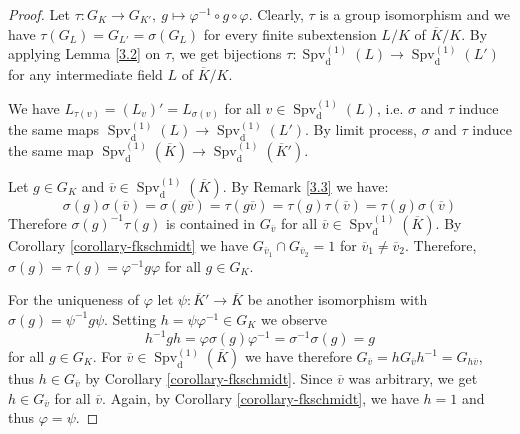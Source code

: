 \begin{proof}
Let $\tau:G_K\to G_{K'},\ g\mapsto \varphi^{-1}\circ g\circ \varphi$. Clearly, $\tau$ is a group isomorphism and we have $\tau(G_L)=G_{L'}=\sigma(G_L)$ for every finite subextension $L/K$ of $\overline{K}/K$. By applying Lemma \ref{3.2} on $\tau$, we get bijections $\tau: \operatorname{Spv}_\text{d}^{(1)}(L)\to \operatorname{Spv}_\text{d}^{(1)}(L')$ for any intermediate field $L$ of $\overline{K}/K$.

We have $L_{\tau(v)} = (L_v)' = L_{\sigma(v)}$ for all $v\in\operatorname{Spv}_\text{d}^{(1)}(L)$, i.e. $\sigma$ and $\tau$ induce the same maps $\operatorname{Spv}_\text{d}^{(1)}(L)\to \operatorname{Spv}_\text{d}^{(1)}(L')$. By limit process, $\sigma$ and $\tau$ induce the same map $\operatorname{Spv}_\text{d}^{(1)}(\overline{K})\to \operatorname{Spv}_\text{d}^{(1)}(\overline{K}')$.

Let $g\in G_K$ and $\overline{v}\in\operatorname{Spv}_\text{d}^{(1)}(\overline{K})$. By Remark \ref{3.3} we have:
\[ \sigma(g)\sigma(\overline{v}) = \sigma(g\overline{v}) = \tau(g\overline{v}) = \tau(g)\tau(\overline{v}) = \tau(g) \sigma(\overline{v}) \]
Therefore $\sigma(g)^{-1}\tau(g)$ is contained in $G_{\overline{v}}$ for all $\overline{v}\in\operatorname{Spv}_\text{d}^{(1)}(\overline{K})$. By Corollary \ref{corollary-fkschmidt} we have $G_{\overline{v}_1}\cap G_{\overline{v}_2} = 1$ for $\overline{v}_1\neq\overline{v}_2$. Therefore, $\sigma(g) = \tau(g) = \varphi^{-1}g\varphi$ for all $g\in G_K$.

For the uniqueness of $\varphi$ let $\psi: \overline{K}'\to \overline{K}$ be another isomorphism with $\sigma(g) = \psi^{-1} g \psi$. Setting $h = \psi\varphi^{-1}\in G_K$ we observe
\[ h^{-1}gh = \varphi\sigma(g)\varphi^{-1} = \sigma^{-1}\sigma(g) = g \]
for all $g\in G_K$. For $\overline{v}\in\operatorname{Spv}_\text{d}^{(1)}(\overline{K})$ we have therefore $G_{\overline{v}} = h G_{\overline{v}} h^{-1} = G_{h\overline{v}}$, thus $h\in G_{\overline{v}}$ by Corollary \ref{corollary-fkschmidt}. Since $\overline{v}$ was arbitrary, we get $h\in G_{\overline{v}}$ for all $\overline{v}$. Again, by Corollary \ref{corollary-fkschmidt}, we have $h=1$ and thus $\varphi = \psi$.
\end{proof}
